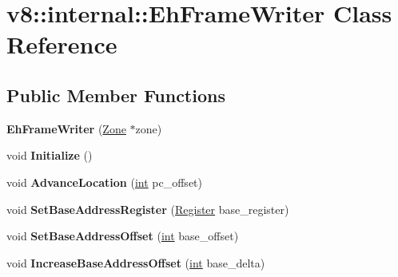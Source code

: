 \hypertarget{classv8_1_1internal_1_1EhFrameWriter}{}\section{v8\+:\+:internal\+:\+:Eh\+Frame\+Writer Class Reference}
\label{classv8_1_1internal_1_1EhFrameWriter}
\subsection*{Public Member Functions}
\begin{DoxyCompactItemize}
\item 
\mbox{\label{classv8_1_1internal_1_1EhFrameWriter_a6201fd9f9b3e3b7486a1d1d921fe84e6}} 
{\bfseries Eh\+Frame\+Writer} (\mbox{\hyperlink{classv8_1_1internal_1_1Zone}{Zone}} $\ast$zone)
\item 
\mbox{\label{classv8_1_1internal_1_1EhFrameWriter_a610f5bcafa5df45bcad90a9c85a9af55}} 
void {\bfseries Initialize} ()
\item 
\mbox{\label{classv8_1_1internal_1_1EhFrameWriter_a8fa539419cde716b6ea9c4e643de0278}} 
void {\bfseries Advance\+Location} (\mbox{\hyperlink{classint}{int}} pc\+\_\+offset)
\item 
\mbox{\label{classv8_1_1internal_1_1EhFrameWriter_ad7eef4afaec4035fcb48b52b0b912247}} 
void {\bfseries Set\+Base\+Address\+Register} (\mbox{\hyperlink{classv8_1_1internal_1_1Register}{Register}} base\+\_\+register)
\item 
\mbox{\label{classv8_1_1internal_1_1EhFrameWriter_a0cfa93b9af6d099d505e4fc62d8261fd}} 
void {\bfseries Set\+Base\+Address\+Offset} (\mbox{\hyperlink{classint}{int}} base\+\_\+offset)
\item 
\mbox{\label{classv8_1_1internal_1_1EhFrameWriter_a4b1faf3d7afcfd189dd164c8c1f9ca9c}} 
void {\bfseries Increase\+Base\+Address\+Offset} (\mbox{\hyperlink{classint}{int}} base\+\_\+delta)
\item 
\mbox{\label{classv8_1_1internal_1_1EhFrameWriter_a24aff5e18b8b45accf0e7c7bed6ec848}} 

\end{DoxyCompactItemize}
